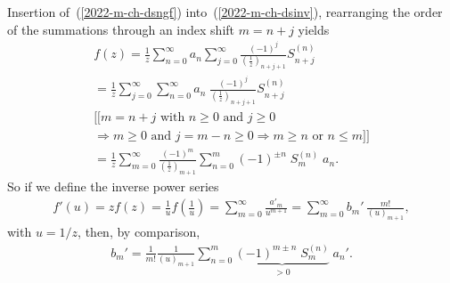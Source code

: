 Insertion of~(\ref{2022-m-ch-dsngf})  into~(\ref{2022-m-ch-dsinv}), rearranging the order of the summations through an index shift $m = n+j$ yields
\begin{equation}
\begin{split}
f(z)
= \frac{1}{z}  \sum_{n=0}^\infty a_n \sum_{j=0}^\infty \frac{(-1)^j}{\left(\frac{1}{z}\right)_{n+j+1}} {S}_{n+j}^{(n)}
\\
= \frac{1}{z}  \sum_{j=0}^\infty \sum_{n=0}^\infty a_n \;  \frac{(-1)^j}{\left(\frac{1}{z}\right)_{n+j+1}} {S}_{n+j}^{(n)}
\\
[[ m = n+j \text{ with }  n \ge 0 \text{ and }  j \ge 0
\\
\Rightarrow  m \ge 0  \text{ and } j = m - n \ge 0 \Rightarrow m \ge n \text{ or }  n \le m]]
\\
= \frac{1}{z} \sum_{m=0}^\infty   \frac{(-1)^m}{\left(\frac{1}{z}\right)_{m+1}} \sum_{n=0}^m (-1)^{\pm n} \; {S}_{m}^{(n)} \; a_n
.
\end{split}
\label{2022-m-ch-dsinv2}
\end{equation}
So if we define the inverse power series
\begin{equation}
\begin{split}
f'(u)
= z f(z)
= \frac{1}{u} f\left( \frac{1}{u} \right)
= \sum_{m=0}^\infty \frac{a'_m}{u^{m+1}}
= \sum_{m=0}^\infty b_m' \, \frac{m!}{(u)_{m+1}}
,
\end{split}
\label{2022-m-ch-comp1}
\end{equation}
with $u=1/z$,
then, by comparison,
\begin{equation}
\begin{split}
b_m'= \frac{1}{m!} \frac{1}{\left(u \right)_{m+1}} \sum_{n=0}^m \underbrace{(-1)^{m\pm n}  \; {S}_{m}^{(n)}}_{>0} \; a_n'
.
\end{split}
\label{2022-m-ch-comp}
\end{equation}

